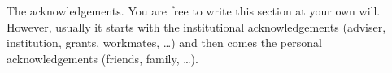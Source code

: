 \acknowledgements

The acknowledgements. You are free to write this section at your own will.  However, usually it starts with the institutional acknowledgements (adviser, institution, grants, workmates, \ldots) and then comes the personal acknowledgements (friends, family, \ldots).

